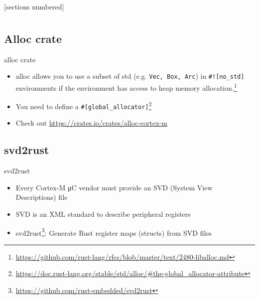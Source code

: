 \documentclass[aspectratio=1610,14pt,t]{beamer}
\begin{document}
[sections numbered]
\appendix
\section{\appendixname}
\frame{\tableofcontents}
\subsection{Alloc crate}

\begin{frame}[c]{alloc crate}
  \begin{itemize}
    \item alloc allows you to use a subset of std (e.g. \texttt{Vec, Box, Arc})
      in \texttt{\#![no\_std]} environments if the environment has access to
      heap memory allocation.\footnote{\url{https://github.com/rust-lang/rfcs/blob/master/text/2480-liballoc.md}}
    \item You need to define a \texttt{\#[global\_allocator]}\footnote{\url{https://doc.rust-lang.org/stable/std/alloc/\#the-global\_allocator-attribute}}
    \item Check out \url{https://crates.io/crates/alloc-cortex-m}
  \end{itemize}
\end{frame}

\subsection{svd2rust}

\begin{frame}[c]{svd2rust}
  \begin{itemize}
    \item Every Cortex-M μC vendor must provide an SVD (System View
      Descriptions) file
    \item SVD is an XML standard to describe peripheral registers
    \item svd2rust\footnote{\url{https://github.com/rust-embedded/svd2rust}}:
      Generate Rust register maps (structs) from SVD files
  \end{itemize}
\end{frame}
\end{document}
